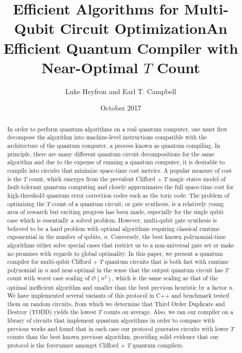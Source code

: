 \documentclass[notitlepage]{article}
\title{Efficient Algorithms for Multi-Qubit Circuit Optimization}
\title{An Efficient Quantum Compiler with Near-Optimal $T$ Count}
\author{Luke Heyfron and Earl T. Campbell}
\date{October 2017}
\theoremstyle{definition}
\theoremstyle{problem}
\theoremstyle{lemma}
\begin{document}
	\maketitle
	\begin{abstract}
In order to perform quantum algorithms on a real quantum computer, one must first decompose the algorithm into machine-level instructions compatible with the architecture of the quantum computer, a process known as quantum compiling.
In principle, there are many different quantum circuit decompositions for the same algorithm and due to the expense of running a quantum computer, it is desirable to compile into circuits that minimize space-time cost metrics. A popular measure of cost is the $T$ count, which emerges from the prevalent Clifford + $T$ magic states model of fault-tolerant quantum computing and closely approximates the full space-time cost for high-threshold quantum error correction codes such as the toric code.
The problem of optimizing the $T$ count of a quantum circuit, or gate synthesis, is a relatively young area of research but exciting progress has been made, especially for the single qubit case which is essentially a solved problem. However, multi-qubit gate synthesis is believed to be a hard problem with optimal algorithms requiring classical runtime exponential in the number of qubits, $n$. Conversely, the best known polynomial-time algorithms either solve special cases that restrict us to a non-universal gate set or make no promises with regards to global optimality. In this paper, we present a quantum compiler for multi-qubit Clifford + $T$ quantum circuits that is both fast with runtime polynomial in $n$ and near-optimal in the sense that the output quantum circuit has $T$ count with worst case scaling of $\mathcal{O}(n^2)$, which is the same scaling as that of the optimal inefficient algorithm and smaller than the best previous heuristic by a factor $n$. We have implemented several variants of this protocol in C++ and benchmark tested them on random circuits, from which we determine that Third Order Duplicate and Destroy (TODD) yields the lowest $T$ counts on average. Also, we ran our compiler on a library of circuits that implement quantum algorithms in order to compare with previous works and found that in each case our protocol generates circuits with lower $T$ counts than the best known previous algorithm, providing solid evidence that our protocol is the forerunner amongst Clifford + $T$ quantum compilers.
		

\end{abstract}
\end{document}
